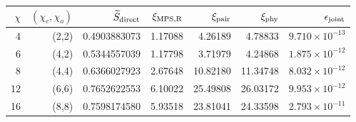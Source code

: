 \begin{tabular}{rrrrrrr}
\toprule
$\chi$ & $(\chi_e,\chi_o)$ & $\widetilde S_{\rm direct}$ & $\xi_{\rm MPS,R}$ & $\xi_{\rm pair}$ & $\xi_{\rm phy}$ & $\epsilon_{\rm joint}$ \\
\midrule
4 & (2,2) & 0.4903883073 & 1.17088 & 4.26189 & 4.78833 & $9.710\times10^{-13}$ \\
6 & (4,2) & 0.5344557039 & 1.17798 & 3.71979 & 4.24868 & $1.875\times10^{-12}$ \\
8 & (4,4) & 0.6366027923 & 2.67648 & 10.82180 & 11.34748 & $8.032\times10^{-12}$ \\
12 & (6,6) & 0.7652622553 & 6.10022 & 25.49808 & 26.03172 & $9.953\times10^{-12}$ \\
16 & (8,8) & 0.7598174580 & 5.93518 & 23.81041 & 24.33598 & $2.793\times10^{-11}$ \\
\bottomrule
\end{tabular}
